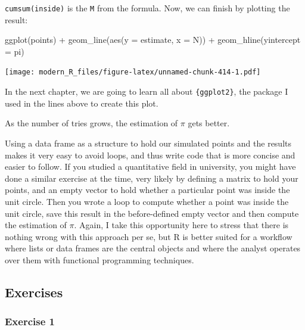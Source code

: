 \documentclass[
]{article}
\newenvironment{Shaded}{\begin{snugshade}}{\end{snugshade}}
\newcommand{\AttributeTok}[1]{\textcolor[rgb]{0.77,0.63,0.00}{#1}}
\newcommand{\FunctionTok}[1]{\textcolor[rgb]{0.00,0.00,0.00}{#1}}
\newcommand{\NormalTok}[1]{#1}
\newcommand{\SpecialCharTok}[1]{\textcolor[rgb]{0.00,0.00,0.00}{#1}}
\begin{document}
\texttt{cumsum(inside)} is the \texttt{M} from the formula. Now, we can finish by plotting the result:

\begin{Shaded}
\begin{Highlighting}[]
\FunctionTok{ggplot}\NormalTok{(points) }\SpecialCharTok{+}
    \FunctionTok{geom\_line}\NormalTok{(}\FunctionTok{aes}\NormalTok{(}\AttributeTok{y =}\NormalTok{ estimate, }\AttributeTok{x =}\NormalTok{ N)) }\SpecialCharTok{+}
    \FunctionTok{geom\_hline}\NormalTok{(}\AttributeTok{yintercept =}\NormalTok{ pi)}
\end{Highlighting}
\end{Shaded}

\texttt{[image: modern\_R\_files/figure-latex/unnamed-chunk-414-1.pdf]}

In the next chapter, we are going to learn all about \texttt{\{ggplot2\}}, the package I used in the lines
above to create this plot.

As the number of tries grows, the estimation of \(\pi\) gets better.

Using a data frame as a structure to hold our simulated points and the results makes it very easy
to avoid loops, and thus write code that is more concise and easier to follow.
If you studied a quantitative field in university, you might have done a similar exercise at the
time, very likely by defining a matrix to hold your points, and an empty vector to hold whether a
particular point was inside the unit circle. Then you wrote a loop to compute whether
a point was inside the unit circle, save this result in the before-defined empty vector and then
compute the estimation of \(\pi\). Again, I take this opportunity here to stress that there is nothing
wrong with this approach per se, but R is better suited for a workflow where lists or data frames
are the central objects and where the analyst operates over them with functional programming techniques.

\hypertarget{exercises-2}{%
\subsection{Exercises}\label{exercises-2}}

\hypertarget{exercise-1-2}{%
\subsubsection*{Exercise 1}\label{exercise-1-2}}
\end{document}
